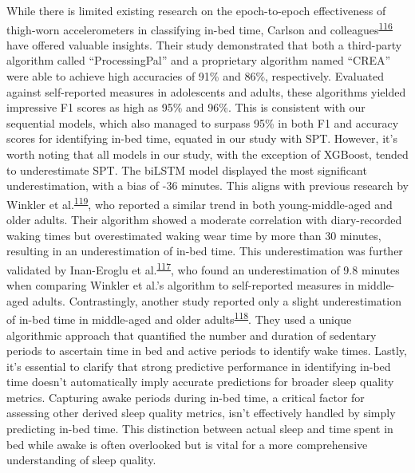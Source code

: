\documentclass[
  10pt,
]{scrbook}
\begin{document}
While there is limited existing research on the epoch-to-epoch
effectiveness of thigh-worn accelerometers in classifying in-bed time,
Carlson and
colleagues\textsuperscript{\protect\hyperlink{ref-carlson_validity_2021}{116}}
have offered valuable insights. Their study demonstrated that both a
third-party algorithm called ``ProcessingPal'' and a proprietary
algorithm named ``CREA'' were able to achieve high accuracies of 91\%
and 86\%, respectively. Evaluated against self-reported measures in
adolescents and adults, these algorithms yielded impressive F1 scores as
high as 95\% and 96\%. This is consistent with our sequential models,
which also managed to surpass 95\% in both F1 and accuracy scores for
identifying in-bed time, equated in our study with SPT. However, it's
worth noting that all models in our study, with the exception of
XGBoost, tended to underestimate SPT. The biLSTM model displayed the
most significant underestimation, with a bias of -36 minutes. This
aligns with previous research by Winkler et
al.\textsuperscript{\protect\hyperlink{ref-winkler_identifying_2016}{119}},
who reported a similar trend in both young-middle-aged and older adults.
Their algorithm showed a moderate correlation with diary-recorded waking
times but overestimated waking wear time by more than 30 minutes,
resulting in an underestimation of in-bed time. This underestimation was
further validated by Inan-Eroglu et
al.\textsuperscript{\protect\hyperlink{ref-inan-eroglu_comparison_2021}{117}},
who found an underestimation of 9.8 minutes when comparing Winkler et
al.'s algorithm to self-reported measures in middle-aged adults.
Contrastingly, another study reported only a slight underestimation of
in-bed time in middle-aged and older
adults\textsuperscript{\protect\hyperlink{ref-van_der_berg_identifying_2016}{118}}.
They used a unique algorithmic approach that quantified the number and
duration of sedentary periods to ascertain time in bed and active
periods to identify wake times. Lastly, it's essential to clarify that
strong predictive performance in identifying in-bed time doesn't
automatically imply accurate predictions for broader sleep quality
metrics. Capturing awake periods during in-bed time, a critical factor
for assessing other derived sleep quality metrics, isn't effectively
handled by simply predicting in-bed time. This distinction between
actual sleep and time spent in bed while awake is often overlooked but
is vital for a more comprehensive understanding of sleep quality.
\end{document}
